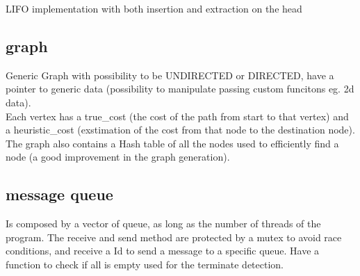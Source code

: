 LIFO implementation with both insertion and extraction on the head

\subsection{graph}

Generic Graph with possibility to be UNDIRECTED or DIRECTED, have a pointer to generic data (possibility to manipulate passing custom funcitons eg. 2d data). \\
Each vertex has a true\_cost (the cost of the path from start to that vertex) and a heuristic\_cost (exstimation of the cost from that node to the destination node).
The graph also contains a Hash table of all the nodes used to efficiently find a node (a good improvement in the graph generation).

\subsection{message queue}
\label{message_queue}

Is composed by a vector of queue, as long as the number of threads of the program.
The receive and send method are protected by a mutex to avoid race conditions, and receive a Id to send a message to a specific queue. Have a function to check if all is empty used for the terminate detection.
